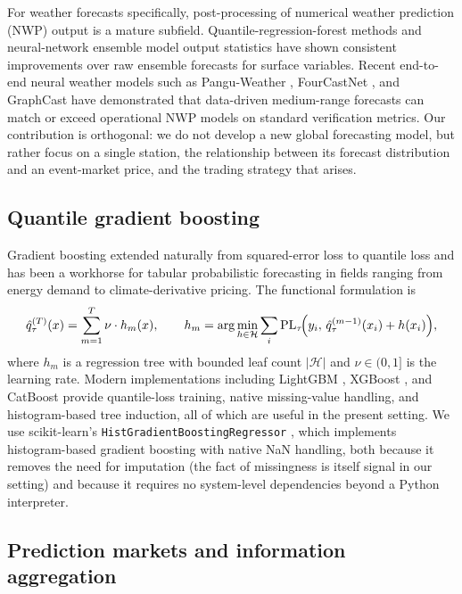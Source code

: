 \documentclass[11pt]{article}
\begin{document}
For weather forecasts specifically, post-processing of numerical weather
prediction (NWP) output is a mature subfield. Quantile-regression-forest
methods \citep{taillardat2016calibrated} and neural-network ensemble model
output statistics \citep{rasp2018neural} have shown consistent improvements
over raw ensemble forecasts for surface variables. Recent end-to-end neural
weather models such as Pangu-Weather \citep{bi2023pangu}, FourCastNet
\citep{pathak2022fourcastnet}, and GraphCast \citep{lam2023graphcast} have
demonstrated that data-driven medium-range forecasts can match or exceed
operational NWP models on standard verification metrics. Our contribution
is orthogonal: we do not develop a new global forecasting model, but rather
focus on a single station, the relationship between its forecast distribution
and an event-market price, and the trading strategy that arises.

\subsection{Quantile gradient boosting}

Gradient boosting \citep{friedman2001greedy,breiman2001random} extended
naturally from squared-error loss to quantile loss and has been a workhorse
for tabular probabilistic forecasting in fields ranging from energy demand
\citep{hong2016probabilistic} to climate-derivative pricing. The functional
formulation is
\begin{equation}
\hat{q}_\tau^{(T)}(x) = \sum_{m=1}^{T} \nu \cdot h_m(x), \qquad
h_m = \arg\min_{h \in \mathcal{H}} \sum_i \mathrm{PL}_\tau\!\Bigl(y_i,\, \hat{q}_\tau^{(m-1)}(x_i) + h(x_i)\Bigr),
\label{eq:gbm}
\end{equation}
where $h_m$ is a regression tree with bounded leaf count
$|\mathcal{H}|$ and $\nu \in (0, 1]$ is the learning rate. Modern
implementations including LightGBM \citep{ke2017lightgbm}, XGBoost
\citep{chen2016xgboost}, and CatBoost \citep{prokhorenkova2018catboost}
provide quantile-loss training, native missing-value handling, and
histogram-based tree induction, all of which are useful in the present
setting. We use scikit-learn's \texttt{HistGradientBoostingRegressor}
\citep{pedregosa2011scikit}, which implements histogram-based gradient
boosting with native NaN handling, both because it removes the need for
imputation (the fact of missingness is itself signal in our setting) and
because it requires no system-level dependencies beyond a Python
interpreter.

\subsection{Prediction markets and information aggregation}
\end{document}
